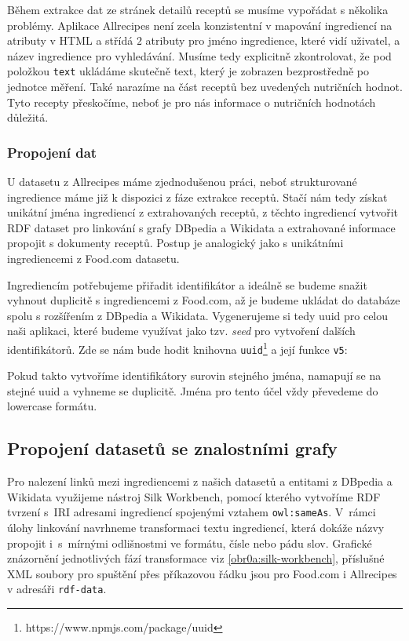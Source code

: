 Během extrakce dat ze stránek detailů receptů se musíme vypořádat s několika problémy. Aplikace Allrecipes není zcela konzistentní v mapování ingrediencí na atributy v HTML a střídá $2$ atributy pro jméno ingredience, které vidí uživatel, a název ingredience pro vyhledávání. Musíme tedy explicitně zkontrolovat, že pod položkou \texttt{text} ukládáme skutečně text, který je zobrazen bezprostředně po jednotce měření. Také narazíme na část receptů bez uvedených nutričních hodnot. Tyto recepty přeskočíme, neboť je pro nás informace o nutričních hodnotách důležitá.

\subsubsection{Propojení dat}

U datasetu z Allrecipes máme zjednodušenou práci, neboť strukturované ingredience máme již k dispozici z fáze extrakce receptů. Stačí nám tedy získat unikátní jména ingrediencí z extrahovaných receptů, z těchto ingrediencí vytvořit RDF dataset pro linkování s grafy DBpedia a Wikidata a extrahované informace propojit s dokumenty receptů. Postup je analogický jako s unikátními ingrediencemi z Food.com datasetu. 

Ingrediencím potřebujeme přiřadit identifikátor a ideálně se budeme snažit vyhnout duplicitě s ingrediencemi z Food.com, až je budeme ukládat do databáze spolu s rozšířením z DBpedia a Wikidata. Vygenerujeme si tedy uuid pro celou naši aplikaci, které budeme využívat jako tzv. \emph{seed} pro vytvoření dalších identifikátorů. Zde se nám bude hodit knihovna \texttt{uuid}\footnote{https://www.npmjs.com/package/uuid} a její funkce \texttt{v5}:
\begin{code}
uuid.v5(name, NAMESPACE_UUID)}
\end{code}
Pokud takto vytvoříme identifikátory surovin stejného jména, namapují se na stejné uuid a vyhneme se duplicitě. Jména pro tento účel vždy převedeme do lowercase formátu.

\subsection{Propojení datasetů se znalostními grafy}

Pro nalezení linků mezi ingrediencemi z našich datasetů a entitami z DBpedia a Wikidata využijeme nástroj Silk Workbench, pomocí kterého vytvoříme RDF tvrzení s~IRI adresami ingrediencí spojenými vztahem \texttt{owl:sameAs}. V~rámci úlohy linkování navrhneme transformaci textu ingrediencí, která dokáže názvy propojit i~s~mírnými odlišnostmi ve formátu, čísle nebo pádu slov. Grafické znázornění jednotlivých fází transformace viz \ref{obr0a:silk-workbench}, příslušné XML soubory pro spuštění přes příkazovou řádku jsou pro Food.com i Allrecipes v adresáři \texttt{rdf-data}.

